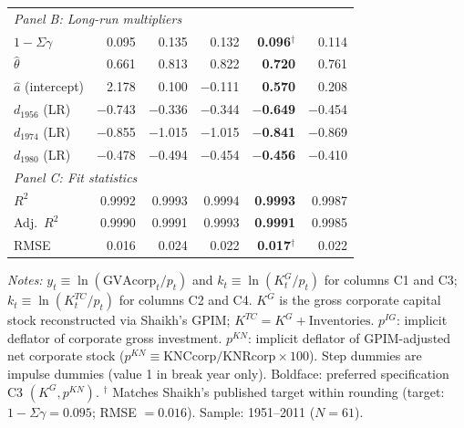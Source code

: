 \begin{table}[H]
\begin{threeparttable}
{\begin{tabular}{lrrrrr}
				\midrule
				\multicolumn{6}{l}{\textit{Panel B: Long-run multipliers}} \\[2pt]
				$1 - \Sigma\gamma$
				&  0.095  &  0.135  &  0.132  &  \textbf{0.096}$^{\dagger}$  &  0.114  \\
				$\hat{\theta}$
				&  0.661  &  0.813  &  0.822  &  \textbf{0.720}  &  0.761  \\
				$\hat{a}$ (intercept)
				&  2.178  &  0.100  & $-$0.111  &  \textbf{0.570}  &  0.208  \\[4pt]
				$d_{1956}$ (LR)
				& $-$0.743  & $-$0.336  & $-$0.344  & $\bm{-}$\textbf{0.649}  & $-$0.454  \\
				$d_{1974}$ (LR)
				& $-$0.855  & $-$1.015  & $-$1.015  & $\bm{-}$\textbf{0.841}  & $-$0.869  \\
				$d_{1980}$ (LR)
				& $-$0.478  & $-$0.494  & $-$0.454  & $\bm{-}$\textbf{0.456}  & $-$0.410  \\[4pt]
				\midrule
				\multicolumn{6}{l}{\textit{Panel C: Fit statistics}} \\[2pt]
				$R^2$
				&  0.9992  &  0.9993  &  0.9994  &  \textbf{0.9993}  &  0.9987  \\
				Adj.\ $R^2$
				&  0.9990  &  0.9991  &  0.9993  &  \textbf{0.9991}  &  0.9985  \\
				RMSE
				&  0.016  &  0.024  &  0.022  &  \textbf{0.017}$^{\dagger}$  &  0.022  \\
				\bottomrule
		\end{tabular}}
		\begin{tablenotes}
			\item \textit{Notes:}
			$y_t \equiv \ln(\text{GVAcorp}_t / p_t)$ and
			$k_t \equiv \ln(K^G_t / p_t)$ for columns C1 and C3;
			$k_t \equiv \ln(K^{TC}_t / p_t)$ for columns C2 and C4.
			$K^G$ is the gross corporate capital stock reconstructed via Shaikh's GPIM;
			$K^{TC} = K^G + \text{Inventories}$.
			$p^{IG}$: implicit deflator of corporate gross investment.
			$p^{KN}$: implicit deflator of GPIM-adjusted net corporate stock
			($p^{KN} \equiv \text{KNCcorp}/\text{KNRcorp} \times 100$).
			Step dummies are impulse dummies (value 1 in break year only).
			Boldface: preferred specification C3 $(K^G, p^{KN})$.
			$^{\dagger}$ Matches Shaikh's published target within rounding
			(target: $1 - \Sigma\gamma = 0.095$; RMSE $= 0.016$).
			Sample: 1951--2011 ($N=61$).
		\end{tablenotes}
	\end{threeparttable}
\end{table}

